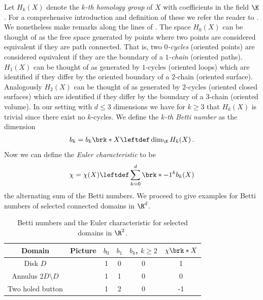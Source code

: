 Let $H_k(X)$ denote the \emph{$k$-th homology group} of $X$ with coefficients in the field $\K$.
For a comprehensive introduction and definition of these we refer the reader to \cite[Chapter 2]{Hatcher2002}.
We nonetheless make remarks along the lines of \cite{Cantarella2002}.
The space $H_0(X)$ can be thought of as the free space generated by points where two points
are considered equivalent if they are path connected. That is, two \emph{$0$-cycles} (oriented points) are considered equivalent if
they are the boundary of a \emph{$1$-chain} (oriented paths).
$H_1(X)$ can be thought of as generated by $1$-cycles (oriented loops) which are identified if they differ by the oriented boundary of a $2$-chain (oriented surface).
Analogously $H_2(X)$ can be thought of as generated by $2$-cycles (oriented closed surfaces) which are identified if they
differ by the boundary of a $3$-chain (oriented volume).
In our setting with $d\leq3$ dimensions we have for $k\geq3$ that $H_k(X)$ is trivial since there exist no $k$-cycles.
We define the \emph{$k$-th Betti number} as the dimension
\begin{align}
  b_k=b_k\brk*{X}\leftdef\dim_\K H_k(X)\,.\label{eq:df_bettiNbrs}
\end{align}
%
Now we can define the \emph{Euler characteristic} to be
\begin{align}
  \chi=\chi(X)\leftdef\sum_{k=0}^d\brk*{-1}^{k}b_k(X)\label{eq:Morse_Euler}
\end{align}
the alternating sum of the Betti numbers.
% 
We proceed to give examples for Betti numbers of selected connected domains in $\R^d$.
% 
\begin{table}[h]
  \centering
  \renewcommand{\arraystretch}{3}
  \begin{tabular}{c|c|c|c|c|c}
    Domain & Picture & $b_0$ & $b_1$ & $b_k$, $k\geq2$ & $\chi\brk*{X}$ \\ \hline
    Disk $D$ & 
    \begin{minipage}{0.1\textwidth}
      \def\svgwidth{\textwidth}
      
    \end{minipage}
    & 1 & 0 & 0 & 1 \\
    Annulus $2D\setminus D$ & 
    \begin{minipage}{0.1\textwidth}
      \def\svgwidth{\textwidth}
      
    \end{minipage}
    & 1 & 1 & 0 & 0 \\
    Two holed button & 
    \begin{minipage}{0.1\textwidth}
      \def\svgwidth{\textwidth}
      
    \end{minipage}
    & 1 & 2 & 0 & -1\\
  \end{tabular}
  \caption{Betti numbers and the Euler characteristic for selected domains in $\R^2$.}
  \label{tb:n2_domains_bettiNbrs}
\end{table}
